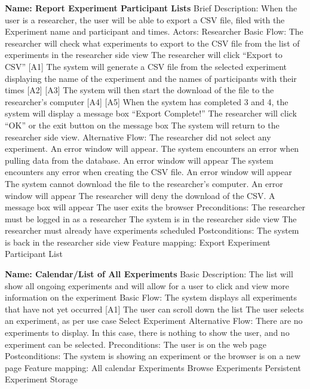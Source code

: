 \begin{outline}[enumerate]
\1 {\bf Name: Report Experiment Participant Lists}
\2 Brief Description:  When the user is a researcher, the user will be able to export a CSV file, filed with the Experiment name and participant and times.
\2 Actors: Researcher
\2 Basic Flow:
\3 The researcher will check what experiments to export to the CSV file from the list of experiments in the researcher side view
\3 The researcher will click ``Export to CSV” [A1] 
\3 The system will generate a CSV file from the selected experiment displaying the name of the experiment and the names of participants with their times [A2] [A3]
\3 The system will then start the download of the file to the researcher's computer [A4] [A5]
\3 When the system has completed 3 and 4, the system will display a message box “Export Complete!”
\3 The researcher will click ``OK” or the exit button on the message box
\3 The system will return to the researcher side view.
\2 Alternative Flow:
\3 [A1] The researcher did not select any experiment.  An error window will appear.
\3 [A2] The system encounters an error when pulling data from the database. An error window will appear
\3 [A3] The system encounters any error when creating the CSV file. An error window will appear
\3 [A4] The system cannot download the file to the researcher's computer. An error window will appear
\3 [A5] The researcher will deny the download of the CSV.  A message box will appear
\3 [A6] The user exits the browser
\2 Preconditions:
\3 The researcher must be logged in as a researcher
\3 The system is in the researcher side view
\3 The researcher must already have experiments scheduled
\2 Postconditions:
\3 The system is back in the researcher side view
\2 Feature mapping:
\3 Export Experiment Participant List

\1 {\bf Name: Calendar/List of All Experiments}
\2 Basic Description: The list will show all ongoing experiments and will allow for a user to click and view more information on the experiment
\2 Basic Flow:
\3 The system displays all experiments that have not yet occurred [A1]
\3 The user can scroll down the list
\3 The user selects an experiment, as per use case Select Experiment
\2 Alternative Flow:
\3 [A1] There are no experiments to display.  In this case, there is nothing to show the user, and no experiment can be selected.
\2 Preconditions:
\3 The user is on the web page
\2 Postconditions:
\3 The system is showing an experiment or the browser is on a new page
\2 Feature mapping:
\3 All calendar Experiments
\3 Browse Experiments
\3 Persistent Experiment Storage
\end{outline}